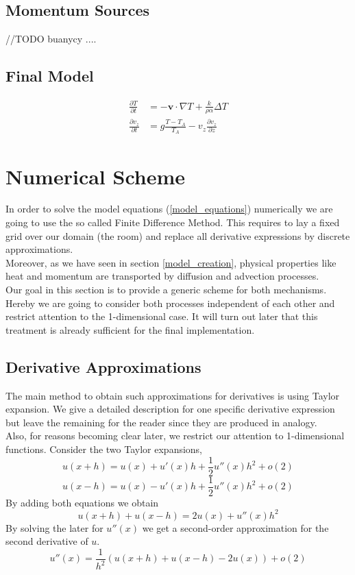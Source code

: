 \documentclass[]{article}
\begin{document}
\subsection{Momentum Sources}
//TODO buanycy ....

\subsection{Final Model}

\begin{align} 
\frac{\partial T}{\partial t}&=-\textbf{v}\cdot \nabla T + \frac{k}{\rho\alpha}\Delta T \label{model_equations} \\
\frac{\partial v_{z}}{\partial t}&=g\frac{T-T_{A}}{T_{A}}-v_{z}\frac{\partial v_{z}}{\partial z} \nonumber
\end{align}


\section{Numerical Scheme}
In order to solve the model equations (\ref{model_equations}) numerically we are going to use the so called Finite Difference Method. This requires to lay a fixed grid over our domain (the room) and replace all derivative expressions by discrete approximations.\\
Moreover, as we have seen in section \ref{model_creation}, physical properties like
heat and momentum are transported by diffusion and advection processes.\\
Our goal in this section is to provide a generic scheme for both mechanisms.
Hereby we are going to consider both processes independent of each other and restrict
attention to the 1-dimensional case. It will turn out later that this treatment is already
sufficient for the final implementation.\\

\subsection{Derivative Approximations} \label{derivate_approx}
The main method to obtain such approximations for derivatives is using Taylor expansion.
We give a detailed description for one specific derivative expression but leave the remaining for the reader since they are produced in analogy.\\
Also, for reasons becoming clear later, we restrict our attention to 1-dimensional functions.
Consider the two Taylor expansions,
\begin{equation*}
u(x+h)=u(x)+u'(x)h+\frac{1}{2}u''(x)h^2+o(2)
\end{equation*}
\begin{equation*}
u(x-h)=u(x)-u'(x)h+\frac{1}{2}u''(x)h^2+o(2)
\end{equation*}
By adding both equations we obtain
\begin{equation*}
u(x+h)+u(x-h)=2u(x)+u''(x)h^2
\end{equation*}
By solving the later for $u''(x)$ we get a second-order approximation for the second derivative
of $u$.
\begin{equation*} 
u''(x)=\frac{1}{h^2}(u(x+h)+u(x-h)-2u(x)) + o(2)
\end{equation*}
\end{document}
